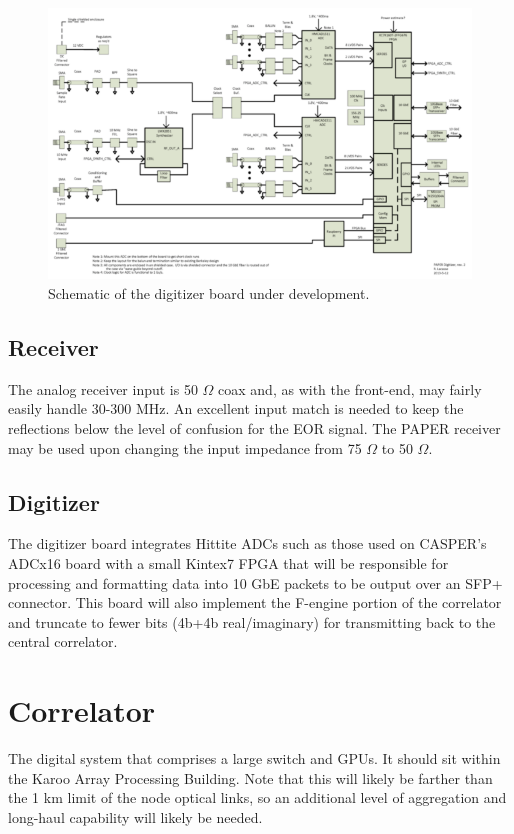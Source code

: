 \documentclass[11pt]{article}
\begin{document}
\begin{figure}[H]
\centering
\includegraphics[width=\textwidth]{plots/herald.png}
\caption{Schematic of the digitizer board under development.}
\label{fig:herald}
\end{figure}

\subsection{Receiver}
The analog receiver input is 50 $\Omega$ coax and, as with the front-end, may fairly easily handle 30-300 MHz.  An excellent input match is needed to keep the reflections below the level of confusion for the EOR signal.  The PAPER receiver may be used upon changing the input impedance from 75 $\Omega$ to 50 $\Omega$.

\subsection{Digitizer}
The digitizer board integrates Hittite ADCs
such as those used on CASPER's ADCx16 board with a small Kintex7 FPGA
that will be responsible for processing and formatting data into 10 GbE packets to be output
over an SFP+ connector.  This board will also implement the F-engine portion of the correlator and truncate to fewer bits (4b+4b real/imaginary) for transmitting back to the central correlator.

\section{Correlator}
The digital system that comprises a large switch and GPUs.  It should sit within the Karoo Array Processing
Building.  Note that this will likely be farther than the 1 km limit of the
node optical links, so an additional level of aggregation and long-haul
capability will likely be needed.
\end{document}
